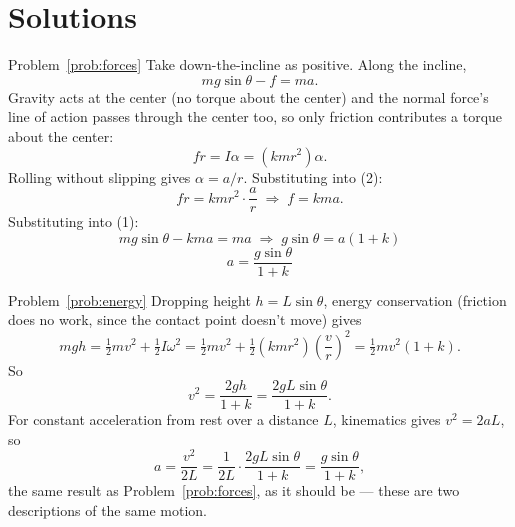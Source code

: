 \documentclass[11pt]{article}
\begin{document}
\newpage
\section*{Solutions}

\begin{pssolution}{Problem~\ref{prob:forces}}{}
Take down-the-incline as positive. Along the incline,
\[
mg\sin\theta - f = ma. \tag{1}
\]
Gravity acts at the center (no torque about the center) and the normal force's line of
action passes through the center too, so only friction contributes a torque about the
center:
\[
fr = I\alpha = (kmr^2)\alpha. \tag{2}
\]
Rolling without slipping gives $\alpha = a/r$. Substituting into (2):
\[
fr = kmr^2 \cdot \frac{a}{r} \;\Longrightarrow\; f = kma.
\]
Substituting into (1):
\[
mg\sin\theta - kma = ma \;\Longrightarrow\; g\sin\theta = a(1+k)
\]
\[
\boxed{a = \frac{g\sin\theta}{1+k}}
\]
\end{pssolution}

\begin{pssolution}{Problem~\ref{prob:energy}}{}
Dropping height $h = L\sin\theta$, energy conservation (friction does no work, since the
contact point doesn't move) gives
\[
mgh = \tfrac12 mv^2 + \tfrac12 I\omega^2 = \tfrac12 mv^2 + \tfrac12(kmr^2)\left(\frac{v}{r}\right)^2
= \tfrac12 mv^2(1+k).
\]
So
\[
v^2 = \frac{2gh}{1+k} = \frac{2gL\sin\theta}{1+k}.
\]
For constant acceleration from rest over a distance $L$, kinematics gives $v^2 = 2aL$, so
\[
a = \frac{v^2}{2L} = \frac{1}{2L}\cdot\frac{2gL\sin\theta}{1+k} = \frac{g\sin\theta}{1+k},
\]
the same result as Problem~\ref{prob:forces}, as it should be --- these are two
descriptions of the same motion.
\end{pssolution}
\end{document}
